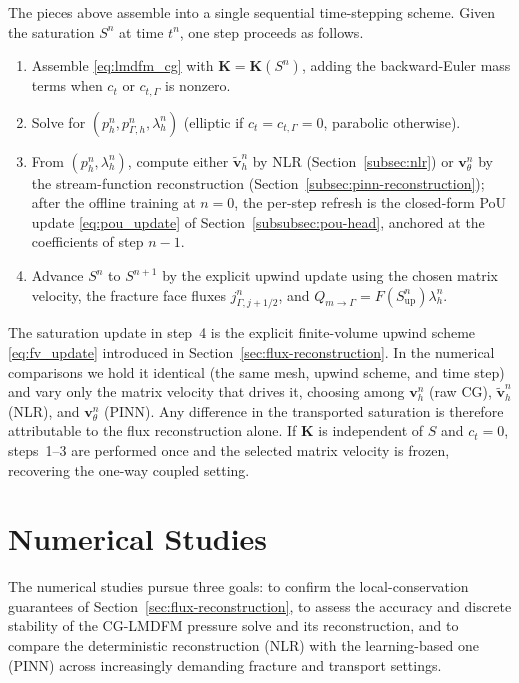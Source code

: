 \documentclass[a4paper,fleqn]{cas-sc}
\newcommand{\Kmat}{\mathbf{K}}
\newcommand{\vflux}{\mathbf{v}}
\begin{document}
The pieces above assemble into a single sequential time-stepping scheme. Given
the saturation \(S^n\) at time \(t^n\), one step proceeds as follows.
\begin{enumerate}
\item Assemble \eqref{eq:lmdfm_cg} with \(\Kmat=\Kmat(S^n)\), adding the
backward-Euler mass terms when \(c_t\) or \(c_{t,\Gamma}\) is nonzero.
\item Solve for \((p_h^n,p_{\Gamma,h}^n,\lambda_h^n)\) (elliptic if
\(c_t=c_{t,\Gamma}=0\), parabolic otherwise).
\item From \((p_h^n,\lambda_h^n)\), compute either
\(\widetilde{\vflux}_h^n\) by NLR (Section~\ref{subsec:nlr}) or
\(\vflux_\theta^n\) by the stream-function reconstruction
(Section~\ref{subsec:pinn-reconstruction}); after the offline training at
\(n=0\), the per-step refresh is the closed-form PoU update
\eqref{eq:pou_update} of Section~\ref{subsubsec:pou-head}, anchored at the
coefficients of step \(n-1\).
\item Advance \(S^n\) to \(S^{n+1}\) by the explicit upwind update using the
chosen matrix velocity, the fracture face fluxes \(j_{\Gamma,j+1/2}^n\), and
\(Q_{m\to\Gamma}=F(S^n_{\mathrm{up}})\lambda_h^n\).
\end{enumerate}
The saturation update in step~4 is the explicit finite-volume upwind scheme
\eqref{eq:fv_update} introduced in Section~\ref{sec:flux-reconstruction}. In the
numerical comparisons we hold it identical (the same mesh, upwind scheme, and
time step) and vary only the matrix velocity that drives it, choosing among
\(\vflux_h^n\) (raw CG), \(\widetilde{\vflux}_h^n\) (NLR), and
\(\vflux_\theta^n\) (PINN). Any difference in the transported saturation is
therefore attributable to the flux reconstruction alone. If \(\Kmat\) is independent of \(S\) and \(c_t=0\),
steps~1--3 are performed once and the selected matrix velocity is frozen,
recovering the one-way coupled setting.

\section{Numerical Studies}
\label{sec:numerical-studies}

The numerical studies pursue three goals: to confirm the local-conservation
guarantees of Section~\ref{sec:flux-reconstruction}, to assess the accuracy and
discrete stability of the CG-LMDFM pressure solve and its reconstruction, and to
compare the deterministic reconstruction (NLR) with the learning-based one (PINN)
across increasingly demanding fracture and transport settings.
\end{document}
